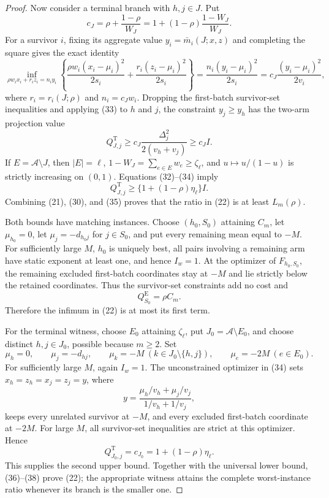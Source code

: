 \documentclass{article}
\begin{document}
\begin{proof}
Now consider a terminal branch with \(h,j\in J\). Put
\[
 c_J=\rho+\frac{1-\rho}{W_J}=1+(1-\rho)\frac{1-W_J}{W_J}. \tag{32}
\]
For a survivor \(i\), fixing its aggregate value \(y_i=\bar m_i(J;x,z)\) and completing the square gives the exact identity
\[
 \inf_{\rho w_i x_i+r_i z_i=n_i y_i}
 \left\{\frac{\rho w_i(x_i-\mu_i)^2}{2s_i}
 +\frac{r_i(z_i-\mu_i)^2}{2s_i}\right\}
 =\frac{n_i(y_i-\mu_i)^2}{2s_i}
 =c_J\frac{(y_i-\mu_i)^2}{2v_i}, \tag{33}
\]
where \(r_i=r_i(J;\rho)\) and \(n_i=c_Jw_i\). Dropping the first-batch survivor-set inequalities and applying (33) to \(h\) and \(j\), the constraint \(y_j\ge y_h\) has the two-arm projection value
\[
 Q_{J,j}^{\mathrm T}\ge c_J\frac{\Delta_j^2}{2(v_h+v_j)}\ge c_J I. \tag{34}
\]
If \(E=\mathcal A\setminus J\), then \(|E|=\ell\), \(1-W_J=\sum_{e\in E}w_e\ge\zeta_\ell\), and \(u\mapsto u/(1-u)\) is strictly increasing on \((0,1)\). Equations (32)--(34) imply
\[
 Q_{J,j}^{\mathrm T}\ge \{1+(1-\rho)\eta_\ell\}I. \tag{35}
\]
Combining (21), (30), and (35) proves that the ratio in (22) is at least \(L_m(\rho)\).

Both bounds have matching instances. Choose \((h_0,S_0)\) attaining \(C_m\), let \(\mu_{h_0}=0\), let \(\mu_j=-d_{h_0j}\) for \(j\in S_0\), and put every remaining mean equal to \(-M\). For sufficiently large \(M\), \(h_0\) is uniquely best, all pairs involving a remaining arm have static exponent at least one, and hence \(I_w=1\). At the optimizer of \(F_{h_0,S_0}\), the remaining excluded first-batch coordinates stay at \(-M\) and lie strictly below the retained coordinates. Thus the survivor-set constraints add no cost and
\[
 Q_{S_0}^{\mathrm E}=\rho C_m. \tag{36}
\]
Therefore the infimum in (22) is at most its first term.

For the terminal witness, choose \(E_0\) attaining \(\zeta_\ell\), put \(J_0=\mathcal A\setminus E_0\), and choose distinct \(h,j\in J_0\), possible because \(m\ge2\). Set
\[
 \mu_h=0,\qquad \mu_j=-d_{hj},\qquad
 \mu_k=-M\ (k\in J_0\setminus\{h,j\}),\qquad
 \mu_e=-2M\ (e\in E_0). \tag{37}
\]
For sufficiently large \(M\), again \(I_w=1\). The unconstrained optimizer in (34) sets \(x_h=z_h=x_j=z_j=y\), where
\[
 y=\frac{\mu_h/v_h+\mu_j/v_j}{1/v_h+1/v_j},
\]
keeps every unrelated survivor at \(-M\), and every excluded first-batch coordinate at \(-2M\). For large \(M\), all survivor-set inequalities are strict at this optimizer. Hence
\[
 Q_{J_0,j}^{\mathrm T}=c_{J_0}=1+(1-\rho)\eta_\ell. \tag{38}
\]
This supplies the second upper bound. Together with the universal lower bound, (36)--(38) prove (22); the appropriate witness attains the complete worst-instance ratio whenever its branch is the smaller one.


\end{proof}
\end{document}
